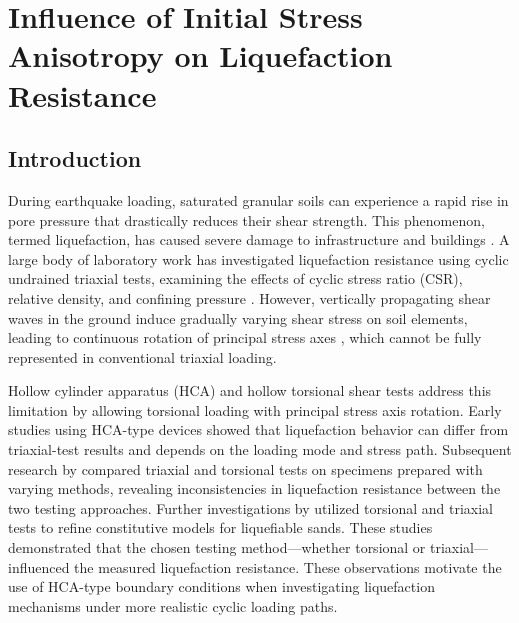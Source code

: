 \documentclass[../main]{subfiles}
\begin{document}
\chapter{Influence of Initial Stress Anisotropy on Liquefaction Resistance}
\label{ch:anisotropic}

\section{Introduction}
\label{sec:ch4_intro}

During earthquake loading, saturated granular soils can experience a rapid rise in pore pressure that drastically reduces their shear strength. This phenomenon, termed liquefaction, has caused severe damage to infrastructure and buildings \citep{IshiharaKoga1981,SeedIdriss1967}. A large body of laboratory work has investigated liquefaction resistance using cyclic undrained triaxial tests, examining the effects of cyclic stress ratio (CSR), relative density, and confining pressure \citep{Hyodo1991,SeedLee1966,Silver1976,Toki1986,Yoshimi1984}. However, vertically propagating shear waves in the ground induce gradually varying shear stress on soil elements, leading to continuous rotation of principal stress axes \citep{Arthur1980,IshiharaTowhata1983,IshiharaYasuda1975}, which cannot be fully represented in conventional triaxial loading.

Hollow cylinder apparatus (HCA) and hollow torsional shear tests address this limitation by allowing torsional loading with principal stress axis rotation. Early studies using HCA-type devices \citep[e.g.,][]{IshiharaYasuda1975,Tatsuoka1986,YamashitaToki1993} showed that liquefaction behavior can differ from triaxial-test results and depends on the loading mode and stress path. Subsequent research by \citet{Tatsuoka1986} compared triaxial and torsional tests on specimens prepared with varying methods, revealing inconsistencies in liquefaction resistance between the two testing approaches. Further investigations by \citet{YamashitaToki1993} utilized torsional and triaxial tests to refine constitutive models for liquefiable sands. These studies demonstrated that the chosen testing method---whether torsional or triaxial---influenced the measured liquefaction resistance. These observations motivate the use of HCA-type boundary conditions when investigating liquefaction mechanisms under more realistic cyclic loading paths.
\end{document}
